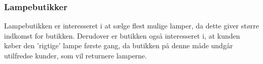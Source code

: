 \subsubsection{Lampebutikker}
Lampebutikken er interesseret i at sælge flest mulige lamper, da dette giver større indkomst for butikken. Derudover er butikken også interesseret i, at kunden køber den 'rigtige' lampe første gang, da butikken på denne måde undgår utilfredse kunder, som vil returnere lamperne.
